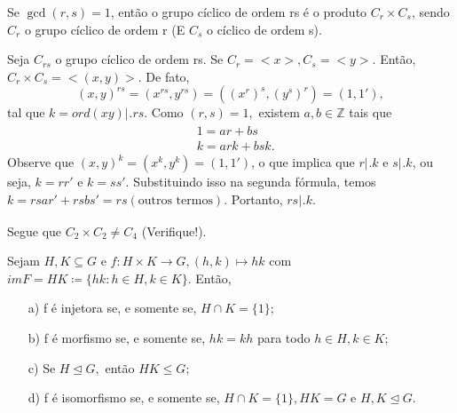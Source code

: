 \documentclass[algebra_notes.tex]{subfiles}
\begin{document}
\begin{prop*}
	Se $\gcd{(r, s)} = 1$, então o grupo cíclico de ordem rs é o produto $C_{r}\times{C_{s}}$, sendo $C_{r}$ o grupo
	cíclico de ordem r (E $C_{s}$ o cíclico de ordem s).
\end{prop*}
\begin{proof*}
	Seja $C_{rs}$ o grupo cíclico de ordem rs. Se $C_{r}=<x>, C_{s} = <y>.$ Então, $C_{r}\times{C_{s}} = <(x, y)>.$ De fato,
	$$
		(x, y)^{rs} = (x^{rs}, y^{rs}) = ((x^{r})^{s}, (y^{s})^{r}) = (1, 1'),
	$$
	tal que $k = ord(xy)\biggl|_{}^{}\biggr.rs.$ Como $(r, s) = 1,$ existem $a, b\in \mathbb{Z}$ tais que
	\begin{align*}
		 & 1 = ar + bs    \\
		 & k = ark + bsk.
	\end{align*}
	Observe que $(x, y)^{k} = (x^{k}, y^{k}) = (1, 1')$, o que implica que $r \biggl|_{}^{}\biggr.k$ e $s \biggl|_{}^{}\biggr.k$, ou seja,
	$k = rr'$ e $k = ss'.$ Substituindo isso na segunda fórmula, temos $k = rsar' + rsbs' = rs(\text{outros termos})$. Portanto,
	$rs \biggl|_{}^{}\biggr.k.$ \qedsymbol
\end{proof*}
\begin{example*}
	Segue que $C_{2}\times C_{2}\neq C_{4}$ (Verifique!).
\end{example*}
\begin{prop*}
	Sejam $H, K \subseteq{G}$ e $f:H\times{K}\rightarrow G, (h,k)\mapsto hk$ com $im F = HK\coloneqq\{hk: h\in H, k\in K\}.$ Então,
	\begin{itemize}
		\item[a)] f é injetora se, e somente se, $H\cap{K} = \{1\};$
		\item[b)] f é morfismo se, e somente se, $hk=kh$ para todo $h\in H, k\in K;$
		\item[c)] Se $H\trianglelefteq{G},$ então $HK\leq{G};$
		\item[d)] f é isomorfismo se, e somente se, $H\cap{K}=\{1\}, HK = G\text{ e }H, K\trianglelefteq{G}.$
	\end{itemize}
\end{prop*}
\end{document}
